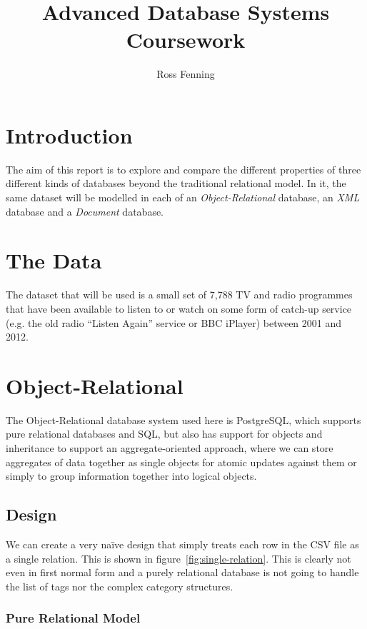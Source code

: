\documentclass[11pt,a4paper]{article}
\title{Advanced Database Systems Coursework}
\author{Ross Fenning}
\begin{document}
\maketitle

\section{Introduction}

The aim of this report is to explore and compare the different properties of
three different kinds of databases beyond the traditional relational model. In it,
the same dataset will be modelled in each of an \emph{Object-Relational} database,
an \emph{XML} database and a \emph{Document} database.

\section{The Data}

The dataset that will be used is a small set of 7,788 TV and radio programmes
that have been available to listen to or watch on some form of catch-up
service (e.g. the old radio ``Listen Again'' service or BBC iPlayer) between
2001 and 2012.

\section{Object-Relational}
\label{sec:postgres}

The Object-Relational database system used here is PostgreSQL, which supports
pure relational databases and SQL, but also has support for objects and
inheritance to support an aggregate-oriented approach, where we can store
aggregates of data together as single objects for atomic updates against
them or simply to group information together into logical objects.
\cite{sadalage2012nosql}

\subsection{Design}

We can create a very na\"ive design that simply treats each row in the
CSV file as a single relation. This is shown in figure~\ref{fig:single-relation}.
This is clearly not even in first normal form \cite{codd1972further}
and a purely relational database
is not going to handle the list of tags nor the complex category structures.

\subsubsection{Pure Relational Model}
\end{document}
